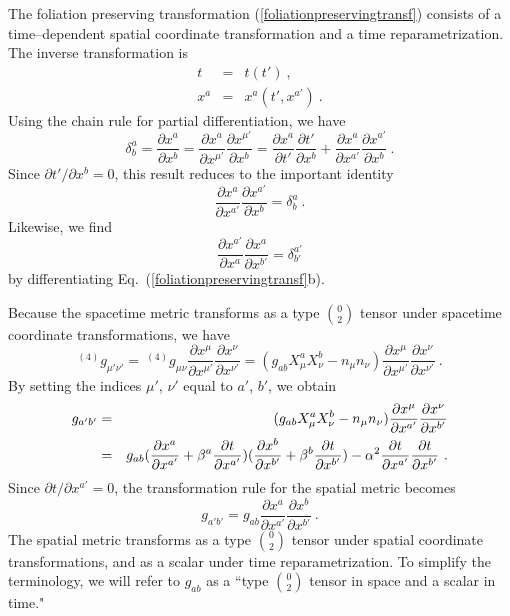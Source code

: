 \documentclass[letterpaper,nofootinbib,prd,amsmath,onecolumn]{revtex4-1}
\begin{document}
The foliation preserving transformation (\ref{foliationpreservingtransf}) consists of a time--dependent spatial coordinate transformation and
a time reparametrization. The inverse transformation is  
\begin{subequations}
\begin{eqnarray}
t & = & t(t') \ ,\\
x^{a} & = & x^{a}(t',x^{a'}) \ .
\end{eqnarray}
\end{subequations}
Using the chain rule for partial differentiation, we have
\[
\delta^{a}_{b} = \frac{\partial x^{a}}{\partial x^{b}} = \frac{\partial x^{a}}{\partial x^{\mu'}}\frac{\partial x^{\mu'}}{\partial x^{b}} = \frac{\partial x^{a}}{\partial t'}\frac{\partial t'}{\partial x^{b}} + \frac{\partial x^{a}}{\partial x^{a'}}\frac{\partial x^{a'}}{\partial x^{b}} \ .
\]
Since $\partial t'/\partial x^{b} = 0$, this result reduces to the important identity  
\begin{equation}
\frac{\partial x^{a}}{\partial x^{a'}}\frac{\partial x^{a'}}{\partial x^{b}} = \delta^{a}_{b} \ .
\end{equation}
Likewise, we find
\begin{equation}
\frac{\partial x^{a'}}{\partial x^{a}}\frac{\partial x^{a}}{\partial x^{b'}} = \delta^{a'}_{b'} 
\end{equation}
by differentiating Eq.~(\ref{foliationpreservingtransf}b). 

Because the spacetime metric transforms as a type $0\choose 2$ tensor under spacetime coordinate transformations, we have
\begin{equation}\label{spacetime metric}
^{(4)}g_{\mu'\nu'} =~^{(4)}g_{\mu\nu}\frac{\partial x^{\mu}}{\partial x^{\mu'}}\frac{\partial x^{\nu}}{\partial x^{\nu'}} 
= (g_{ab}X^{a}_{\mu}X^{b}_{\nu} - n_{\mu}n_{\nu})\frac{\partial x^{\mu}}{\partial x^{\mu'}}\frac{\partial x^{\nu}}{\partial x^{\nu'}} \ .
\end{equation}
By setting the indices $\mu'$, $\nu'$ equal to $a'$, $b'$, we obtain 
\begin{eqnarray*}
g_{a'b'} & = & (g_{ab}X^{a}_{\mu}X^{b}_{\nu} - n_{\mu}n_{\nu})\frac{\partial x^{\mu}}{\partial x^{a'}}\frac{\partial x^{\nu}}{\partial x^{b'}}\notag\\
& = & g_{ab}(\frac{\partial x^{a}}{\partial x^{a'}} + \beta^{a}\frac{\partial t}{\partial x^{a'}})(\frac{\partial x^{b}}{\partial x^{b'}} + \beta^{b}\frac{\partial t}{\partial x^{b'}}) - \alpha^2\frac{\partial t}{\partial x^{a'}}\frac{\partial t}{\partial x^{b'}} \ .
\end{eqnarray*}
Since $\partial t/\partial x^{a'} = 0$, the transformation rule for the spatial metric becomes
\begin{equation}\label{transfruleforgab}
g_{a'b'}  = g_{ab}\frac{\partial x^{a}}{\partial x^{a'}}\frac{\partial x^{b}}{\partial x^{b'}} \ .
\end{equation}
The spatial metric transforms as a type $0 \choose 2$ tensor under spatial coordinate transformations, 
and as a scalar under time reparametrization. To simplify the terminology, we will refer to $g_{ab}$ as a ``type $0\choose 2$ tensor in 
space and a scalar in time."
\end{document}
